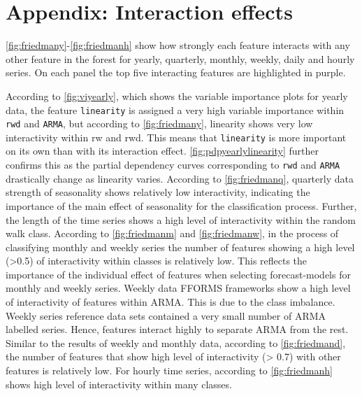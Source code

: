 \documentclass[11pt,a4paper,]{article}
\begin{document}
\hypertarget{appendix-interaction-effects}{%
\section*{Appendix: Interaction effects}\label{appendix-interaction-effects}}

\autoref{fig:friedmany}-\autoref{fig:friedmanh} show how strongly each feature interacts with any other feature in the forest for yearly, quarterly, monthly, weekly, daily and hourly series. On each panel the top five interacting features are highlighted in purple.

According to \autoref{fig:viyearly}, which shows the variable importance plots for yearly data, the feature \texttt{linearity} is assigned a very high variable importance within \texttt{rwd} and \texttt{ARMA}, but according to \autoref{fig:friedmany}, linearity shows very low interactivity within rw and rwd. This means that \texttt{linearity} is more important on its own than with its interaction effect. \autoref{fig:pdpyearlylinearity} further confirms this as the partial dependency curves corresponding to \texttt{rwd} and \texttt{ARMA} drastically change as linearity varies. According to \autoref{fig:friedmanq}, quarterly data strength of seasonality shows relatively low interactivity, indicating the importance of the main effect of seasonality for the classification process. Further, the length of the time series shows a high level of interactivity within the random walk class. According to \autoref{fig:friedmanm} and \autoref{fig:friedmanw}, in the process of classifying monthly and weekly series the number of features showing a high level (\textgreater{}0.5) of interactivity within classes is relatively low. This reflects the importance of the individual effect of features when selecting forecast-models for monthly and weekly series. Weekly data FFORMS frameworks show a high level of interactivity of features within ARMA. This is due to the class imbalance. Weekly series reference data sets contained a very small number of ARMA labelled series. Hence, features interact highly to separate ARMA from the rest. Similar to the results of weekly and monthly data, according to \autoref{fig:friedmand}, the number of features that show high level of interactivity (\textgreater{} 0.7) with other features is relatively low. For hourly time series, according to \autoref{fig:friedmanh} shows high level of interactivity within many classes.
\end{document}
